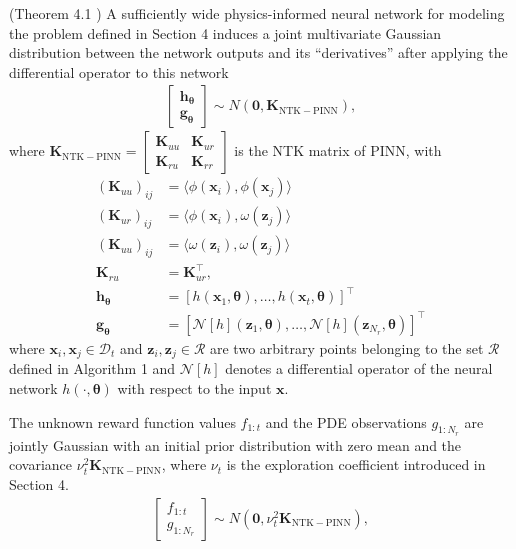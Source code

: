 \begin{lemma}{(Theorem 4.1 \citet{wang2022and})}
\label{lemma:PINN_GP}
A sufficiently wide physics-informed neural network for modeling the problem defined in Section 4 induces a joint multivariate
Gaussian distribution between the network outputs and its ``derivatives'' after applying the differential operator to this network
\begin{align*}
    \begin{bmatrix}
        \mathbf{h}_{\boldsymbol{\theta}} \\
        \mathbf{g}_{\boldsymbol{\theta}} 
\end{bmatrix} \sim N(\mathbf{0}, \mathbf{K}_\mathrm{NTK-PINN}),
\end{align*} 
where $\mathbf{K}_\mathrm{NTK-PINN} = \begin{bmatrix}
    \mathbf{K}_{uu} & \mathbf{K}_{ur} \\
    \mathbf{K}_{ru} & \mathbf{K}_{rr}
\end{bmatrix}$ is the NTK matrix of PINN, with
\begin{align*}
    (\mathbf{K}_{uu})_{ij} &= \langle \phi(\mathbf{x}_i), \phi(\mathbf{x}_j) \rangle \\ 
    (\mathbf{K}_{ur})_{ij} &= \langle \phi(\mathbf{x}_i), \omega(\mathbf{z}_j) \rangle
    \\
    (\mathbf{K}_{uu})_{ij} &= \langle \omega(\mathbf{z}_i), \omega(\mathbf{z}_j) \rangle
    \\
    \mathbf{K}_{ru} &= \mathbf{K}_{ur}^\top, \\ 
    \mathbf{h}_{\boldsymbol{\theta}} &= [h(\mathbf{x}_1, \boldsymbol{\theta}), \dots, h(\mathbf{x}_t, \boldsymbol{\theta})]^\top
    \\
    \mathbf{g}_{\boldsymbol{\theta}} &= \left[\mathcal{N}[h](\mathbf{z}_1, \boldsymbol{\theta}), \dots, \mathcal{N}[h](\mathbf{z}_{N_r}, \boldsymbol{\theta}) \right]^\top
\end{align*}
where $\mathbf{x}_i, \mathbf{x}_j \in \mathcal{D}_t$ and $\mathbf{z}_i, \mathbf{z}_j \in \mathcal{R}$ are two arbitrary points belonging to the set $\mathcal{R}$ defined in Algorithm 1 and $\mathcal{N}[h]$ denotes a differential operator of the neural network $h(\cdot, \boldsymbol{\theta})$ with respect to the input $\mathbf{x}$. 
\end{lemma}
\begin{subcorollary}
\label{corollary:pinn-bo_PINN_GP_func}
    The unknown reward function values $f_{1:t}$ and the PDE observations $g_{1:N_r}$ are jointly Gaussian with an initial prior distribution with zero mean and the covariance $\nu_t^2 \mathbf{K}_\mathrm{NTK-PINN}$, where $\nu_t$ is the exploration coefficient introduced in Section 4. 
\begin{align*}
    \begin{bmatrix}
        f_{1:t} \\
        g_{1:N_r}
\end{bmatrix} \sim N(\mathbf{0}, \nu_t^2 \mathbf{K}_\mathrm{NTK-PINN}),
\end{align*} 
\end{subcorollary}

